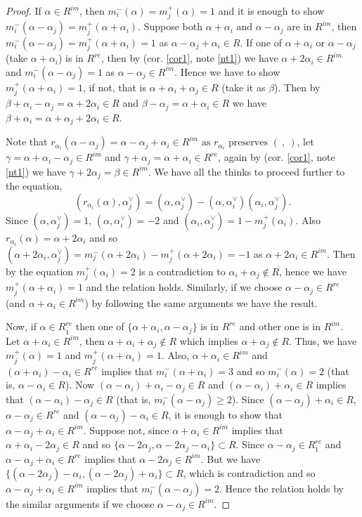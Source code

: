 \documentclass[11pt]{amsart}
\theoremstyle{plain}
\theoremstyle{definition}
\numberwithin{equation}{section}
\newcommand{\al}{\alpha}
\newcommand{\be}{\beta}
\newcommand{\ga}{\gamma}
\begin{document}
	\begin{proof}
		If $\al\in R^{im}$, then $m_i^-(\al)=m_j^+(\al)=1$ and it is enough to show $m_i^-(\al-\al_j)=m_j^+(\al+\al_i)$. Suppose both $\al+\al_i\text{ and }\al-\al_j$ are in $R^{im}$, then $m_i^-(\al-\al_j)=m_j^+(\al+\al_i)=1$ as $\al-\al_j+\al_i\in R$. If one of $\al+\al_i\text{ or }\al-\al_j$ (take $\al+\al_i$) is in $R^{re}$, then by (cor. \ref{cor1}, note \ref{nt1}) we have $\al+2\al_i\in R^{im}$ and  $m_i^-(\al-\al_j)=1$ as $\al-\al_j\in R^{im}$. Hence we have to show $m_j^+(\al+\al_i)=1$, if not, that is $\al+\al_i+\al_j\in R$ (take it as $\be$). Then by $\be+\al_i-\al_j=\al+2\al_i\in R$ and $\be-\al_j=\al+\al_i\in R$ we have $\be+\al_i=\al+\al_j+2\al_i\in R$. 
		
		Note that $r_{\al_i}(\al-\al_j)=\al-\al_j+\al_i\in R^{im}\text{ as }r_{\al_i}\text{ preserves }(~,~)$, let $\ga=\al+\al_i-\al_j\in R^{im}$ and $\ga+\al_j=\al+\al_i\in R^{re}$, again by (cor. \ref{cor1}, note \ref{nt1}) we have $\ga+2\al_j=\be\in R^{im}$. We have all the thinks to proceed further to the equation, $$(r_{\al_i}(\al),\al_j^{\vee})=(\al,\al_j^{\vee})-(\al,\al_i^{\vee})(\al_i,\al_j^{\vee}).$$ 
		Since $(\al,\al_j^{\vee})=1$, $(\al,\al_i^{\vee})=-2$ and $(\al_i,\al_j^{\vee})=1-m_j^+(\al_i)$. Also $r_{\al_i}(\al)=\al+2\al_i$ and so $(\al+2\al_i,\al_j^{\vee})=m_j^-(\al+2\al_i)-m_j^+(\al+2\al_i)=-1$ as $\al+2\al_i\in R^{im}$. Then by the equation $m_j^+(\al_i)=2$  is a contradiction to $\al_i+\al_j\notin R$, hence we have $m_j^+(\al+\al_i)=1$ and the relation holds. Similarly, if we choose $\al-\al_j\in R^{re}$ (and $\al+\al_i\in R^{im}$) by following the same arguments  we have the result.
		
		Now, if $\al\in R_{\bar{1}}^{re}$ then one of $\{\al+\al_i,\al-\al_j\}$ is in $R^{re}$ and other one is in $R^{im}$. Let $\al+\al_i\in R^{im}$, then $\al+\al_i+\al_j\notin R$ which implies $\al+\al_j\notin R$. Thus, we have $m_j^+(\al)=1$ and $m_j^+(\al+\al_i)=1$. Also, $\al+\al_i\in R^{im}$ and $(\al+\al_i)-\al_i\in R^{re}$ implies that $m_i^-(\al+\al_i)=3$ and so $m_i^-(\al)=2$ (that is, $\al-\al_i\in R$). Now $(\al-\al_i)+\al_i-\al_j\in R$ and $(\al-\al_i)+\al_i\in R$ implies that $(\al-\al_i)-\al_j\in R$ (that is, $m_i^-(\al-\al_j)\geq2$). Since $(\al-\al_j)+\al_i\in R$, $\al-\al_j\in R^{re}$ and $(\al-\al_j)-\al_i\in R$, it is enough to show that $\al-\al_j+\al_i\in R^{im}$. Suppose not, since $\al+\al_i\in R^{im}$ implies that $\al+\al_i-2\al_j\in R$ and so $\{\al-2\al_j,\al-2\al_j-\al_i\}\subset R$. Since $\al-\al_j\in R_{\bar{1}}^{re}$ and $\al-\al_j+\al_i\in R^{re}$ implies that $\al-2\al_j\in R^{im}$. But we have $\{(\al-2\al_j)-\al_i,(\al-2\al_j)+\al_i\}\subset R$, which is contradiction and so $\al-\al_j+\al_i\in R^{im}$ implies that $m_i^-(\al-\al_j)=2$. Hence the relation holds by the similar arguments if we choose $\al-\al_j\in R^{im}$.
	\end{proof}
\end{document}
